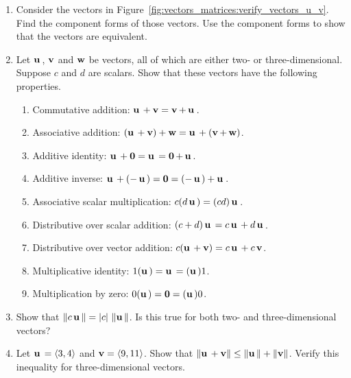 \begin{enumerate}
\item Consider the vectors in
  Figure~\ref{fig:vectors_matrices:verify_vectors_u_v}. Find the
  component forms of those vectors. Use the component forms to show
  that the vectors are equivalent.

\item \label{prob:vectors_matrices:field_laws_for_vectors}
  Let $\vecu$, $\vecv$ and $\vecw$ be vectors, all of which are either
  two- or three-dimensional. Suppose $c$ and $d$ are scalars. Show
  that these vectors have the following properties.
  \begin{enumerate}
  \item Commutative addition: $\vecu + \vecv = \vecv + \vecu$.

  \item Associative addition:
    $(\vecu + \vecv) + \vecw = \vecu + (\vecv + \vecw)$.

  \item Additive identity:
    $\vecu + \veczero = \vecu = \veczero + \vecu$.

  \item Additive inverse:
    $\vecu + (-\vecu) = \veczero = (-\vecu) + \vecu$.

  \item Associative scalar multiplication:
    $c (d \vecu) = (cd) \vecu$.

  \item Distributive over scalar addition:
    $(c + d) \vecu = c\vecu + d\vecu$.

  \item Distributive over vector addition:
    $c (\vecu + \vecv) = c\vecu + c\vecv$.

  \item Multiplicative identity:
    $1 (\vecu) = \vecu = (\vecu) 1$.

  \item Multiplication by zero:
    $0 (\vecu) = \veczero = (\vecu) 0$.
  \end{enumerate}

\item Show that $
  \vecvertl c\vecu \vecvertr
  =
  \left\arrowvert
  c\right\arrowvert \, \vecvertl \vecu
  \vecvertr$. Is this true for both two- and three-dimensional
  vectors?

\item Let $\vecu = \langle 3, 4 \rangle$ and
  $\vecv = \langle 9, 11 \rangle$. Show that $
  \vecvertl \vecu + \vecv\vecvertr
  \leq
  \vecvertl \vecu \vecvertr
  +
  \vecvertl \vecv \vecvertr$. Verify this inequality for
  three-dimensional vectors.


\end{enumerate}

